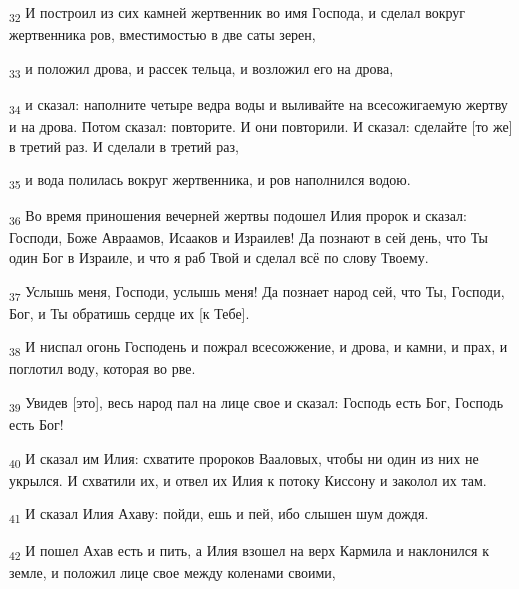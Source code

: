 \begin{tcolorbox}
\textsubscript{32} И построил из сих камней жертвенник во имя Господа, и сделал вокруг жертвенника ров, вместимостью в две саты зерен,
\end{tcolorbox}
\begin{tcolorbox}
\textsubscript{33} и положил дрова, и рассек тельца, и возложил его на дрова,
\end{tcolorbox}
\begin{tcolorbox}
\textsubscript{34} и сказал: наполните четыре ведра воды и выливайте на всесожигаемую жертву и на дрова. Потом сказал: повторите. И они повторили. И сказал: сделайте [то же] в третий раз. И сделали в третий раз,
\end{tcolorbox}
\begin{tcolorbox}
\textsubscript{35} и вода полилась вокруг жертвенника, и ров наполнился водою.
\end{tcolorbox}
\begin{tcolorbox}
\textsubscript{36} Во время приношения вечерней жертвы подошел Илия пророк и сказал: Господи, Боже Авраамов, Исааков и Израилев! Да познают в сей день, что Ты один Бог в Израиле, и что я раб Твой и сделал всё по слову Твоему.
\end{tcolorbox}
\begin{tcolorbox}
\textsubscript{37} Услышь меня, Господи, услышь меня! Да познает народ сей, что Ты, Господи, Бог, и Ты обратишь сердце их [к Тебе].
\end{tcolorbox}
\begin{tcolorbox}
\textsubscript{38} И ниспал огонь Господень и пожрал всесожжение, и дрова, и камни, и прах, и поглотил воду, которая во рве.
\end{tcolorbox}
\begin{tcolorbox}
\textsubscript{39} Увидев [это], весь народ пал на лице свое и сказал: Господь есть Бог, Господь есть Бог!
\end{tcolorbox}
\begin{tcolorbox}
\textsubscript{40} И сказал им Илия: схватите пророков Вааловых, чтобы ни один из них не укрылся. И схватили их, и отвел их Илия к потоку Киссону и заколол их там.
\end{tcolorbox}
\begin{tcolorbox}
\textsubscript{41} И сказал Илия Ахаву: пойди, ешь и пей, ибо слышен шум дождя.
\end{tcolorbox}
\begin{tcolorbox}
\textsubscript{42} И пошел Ахав есть и пить, а Илия взошел на верх Кармила и наклонился к земле, и положил лице свое между коленами своими,
\end{tcolorbox}
